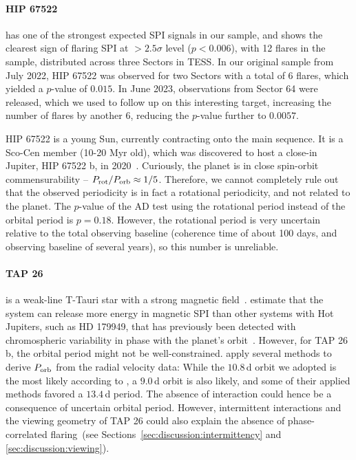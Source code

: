 \documentclass[twocolumn]{aastex631}
\begin{document}
\paragraph{HIP 67522}
\label{sec:results:individualstars:hip67522}
has one of the strongest expected SPI signals in our sample, and shows the clearest sign of flaring SPI at $>2.5\sigma$ level ($p<0.006$), with 12 flares in the sample, distributed across three Sectors in TESS. In our original sample from July 2022, HIP 67522 was observed for two Sectors with a total of 6 flares, which yielded a $p$-value of $0.015$. In June 2023, observations from Sector 64 were released, which we used to follow up on this interesting target, increasing the number of flares by another 6, reducing the $p$-value further to $0.0057$. 

HIP 67522 is a young Sun, currently contracting onto the main sequence. It is a Sco-Cen member (10-20 Myr old), which was discovered to host a close-in Jupiter, HIP 67522 b, in 2020~\citep{rizzuto2020tess}. Curiously, the planet is in close spin-orbit commensurability -- $P_{\rm rot}/P_{\rm orb}\approx 1/5$. Therefore, we cannot completely rule out that the observed periodicity is in fact a rotational periodicity, and not related to the planet. The $p$-value of the AD test using the rotational period instead of the orbital period is $p=0.18$. However, the rotational period is very uncertain relative to the total observing baseline (coherence time of about 100 days, and observing baseline of several years), so this number is unreliable.


\paragraph{TAP 26}
\label{sec:results:individualstars:tap26}
is a weak-line T-Tauri star with a strong magnetic field~\citep{yu2017hot}. \citet{lanza2018closeby} estimate that the system can release more energy in magnetic SPI than other  systems with Hot Jupiters, such as HD 179949, that has previously been detected with chromospheric variability in phase with the planet's orbit~\citep{shkolnik2008nature}. However, for TAP 26 b, the orbital period might not be well-constrained. \citet{yu2017hot} apply several methods to derive $P_{\rm orb}$ from the radial velocity data: While the $10.8\,$d orbit we adopted is the most likely according to \citet{yu2017hot}, a $9.0\,$d orbit is also likely, and some of their applied methods favored a $13.4\,$d period. The absence of interaction could hence be a consequence of uncertain orbital period. However, intermittent interactions and the viewing geometry of TAP 26 could also explain the absence of phase-correlated flaring~(see Sections~\ref{sec:discussion:intermittency} and \ref{sec:discussion:viewing}).
\end{document}
